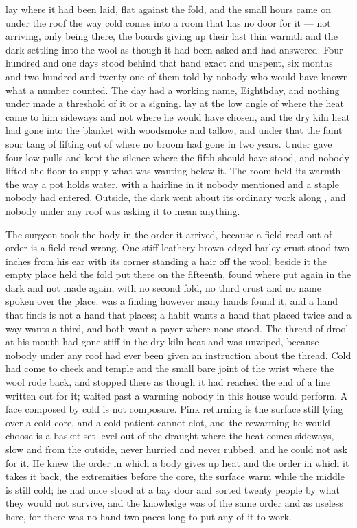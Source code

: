 
 lay where it had been laid, flat against the fold, and the small hours came on under the roof the way cold comes into a room that has no door for it --- not arriving, only being there, the boards giving up their last thin warmth and the dark settling into the wool as though it had been asked and had answered. Four hundred and one days stood behind that hand exact and unspent, six months and two hundred and twenty-one of them told by nobody who would have known what a number counted. The day had a working name, Eighthday, and nothing under  made a threshold of it or a signing.  lay at the low angle of  where the heat came to him sideways and not where he would have chosen, and the dry kiln heat had gone into the blanket with woodsmoke and tallow, and under that the faint sour tang of  lifting out of  where no broom had gone in two years. Under   gave four low pulls and kept the silence where the fifth should have stood, and nobody lifted the floor to supply what was wanting below it. The room held its warmth the way a pot holds water, with a hairline in it nobody mentioned and a staple nobody had entered. Outside, the dark went about its ordinary work along , and nobody under any roof was asking it to mean anything.

The surgeon took the body in the order it arrived, because a field read out of order is a field read wrong. One stiff leathery brown-edged barley crust stood two inches from his ear with its corner standing a hair off the wool; beside it the empty place held the fold put there on the fifteenth, found where put again in the dark and not made again, with no second fold, no third crust and no name spoken over the place.  was a finding however many hands found it, and a hand that finds is not a hand that places; a habit wants a hand that placed twice and a way wants a third, and both want a payer where none stood. The thread of drool at his mouth had gone stiff in the dry kiln heat and was unwiped, because nobody under any roof had ever been given an instruction about the thread. Cold had come to cheek and temple and the small bare joint of the wrist where the wool rode back, and stopped there as though it had reached the end of a line written out for it;  waited past a warming nobody in this house would perform. A face composed by cold is not composure. Pink returning is the surface still lying over a cold core, and a cold patient cannot clot, and the rewarming he would choose is a basket set level out of the draught where the heat comes sideways, slow and from the outside, never hurried and never rubbed, and he could not ask for it. He knew the order in which a body gives up heat and the order in which it takes it back, the extremities before the core, the surface warm while the middle is still cold; he had once stood at a bay door and sorted twenty people by what they would not survive, and the knowledge was of the same order and as useless here, for there was no hand two paces long to put any of it to work.

